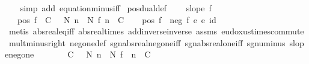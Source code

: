 \begin{isabellebody}
\ \ \isamarkupfalse%
\ {\isacharparenleft}{\kern0pt}simp\ add{\isacharcolon}{\kern0pt}\ equation{\isacharunderscore}{\kern0pt}minus{\isacharunderscore}{\kern0pt}iff{\isacharparenright}{\kern0pt}%
\endisatagproof
{\isafoldproof}%
%
\isadelimproof
\isanewline
%
\endisadelimproof
\isanewline
{}\isamarkupfalse%
\ pos{\isacharunderscore}{\kern0pt}dual{\isacharunderscore}{\kern0pt}def{\isacharcolon}{\kern0pt}\ \isanewline
\ \ \ {\isachardoublequoteopen}slope\ f{\isachardoublequoteclose}\isanewline
\ \ \ {\isachardoublequoteopen}pos\ f\ {\isacharequal}{\kern0pt}\ {\isacharparenleft}{\kern0pt}{\isasymforall}C\ {\isasymge}\ {}{\isachardot}{\kern0pt}\ {\isasymexists}N{\isachardot}{\kern0pt}\ {\isasymforall}n\ {\isasymle}\ N{\isachardot}{\kern0pt}\ f\ n\ {\isasymle}\ {\isacharminus}{\kern0pt}C{\isacharparenright}{\kern0pt}{\isachardoublequoteclose}\isanewline
%
\isadelimproof
%
\endisadelimproof
%
\isatagproof
{}\isamarkupfalse%
{\isacharminus}{\kern0pt}\isanewline
\ \ \isamarkupfalse%
\ {\isachardoublequoteopen}pos\ f\ {\isacharequal}{\kern0pt}\ neg\ {\isacharparenleft}{\kern0pt}f\ {\isacharasterisk}{\kern0pt}\isactrlsub e\ {\isacharparenleft}{\kern0pt}{\isacharminus}{\kern0pt}\isactrlsub e\ id{\isacharparenright}{\kern0pt}{\isacharparenright}{\kern0pt}{\isachardoublequoteclose}\ \isamarkupfalse%
\ {\isacharparenleft}{\kern0pt}metis\ abs{\isacharunderscore}{\kern0pt}real{\isacharunderscore}{\kern0pt}eq{\isacharunderscore}{\kern0pt}iff\ abs{\isacharunderscore}{\kern0pt}real{\isacharunderscore}{\kern0pt}times\ add{\isachardot}{\kern0pt}inverse{\isacharunderscore}{\kern0pt}inverse\ assms\ eudoxus{\isacharunderscore}{\kern0pt}times{\isacharunderscore}{\kern0pt}commute\ mult{\isacharunderscore}{\kern0pt}minus{}{\isacharunderscore}{\kern0pt}right\ neg{\isacharunderscore}{\kern0pt}one{\isacharunderscore}{\kern0pt}def\ sgn{\isacharunderscore}{\kern0pt}abs{\isacharunderscore}{\kern0pt}real{\isacharunderscore}{\kern0pt}neg{\isacharunderscore}{\kern0pt}one{\isacharunderscore}{\kern0pt}iff\ sgn{\isacharunderscore}{\kern0pt}abs{\isacharunderscore}{\kern0pt}real{\isacharunderscore}{\kern0pt}one{\isacharunderscore}{\kern0pt}iff\ sgn{\isacharunderscore}{\kern0pt}uminus\ slope{\isacharunderscore}{\kern0pt}neg{\isacharunderscore}{\kern0pt}one{\isacharparenright}{\kern0pt}\isanewline
\ \ \isamarkupfalse%
\ \isamarkupfalse%
\ {\isachardoublequoteopen}{\isachardot}{\kern0pt}{\isachardot}{\kern0pt}{\isachardot}{\kern0pt}\ {\isacharequal}{\kern0pt}\ {\isacharparenleft}{\kern0pt}{\isasymforall}C\ {\isasymge}\ {}{\isachardot}{\kern0pt}\ {\isasymexists}N{\isachardot}{\kern0pt}\ {\isasymforall}n\ {\isasymge}\ N{\isachardot}{\kern0pt}\ {\isacharparenleft}{\kern0pt}f\ {\isacharparenleft}{\kern0pt}{\isacharminus}{\kern0pt}\ n{\isacharparenright}{\kern0pt}{\isacharparenright}{\kern0pt}\ {\isasymle}\ {\isacharminus}{\kern0pt}C{\isacharparenright}{\kern0pt}{\isachardoublequoteclose}\ \isamarkupfalse%

\end{isabellebody}
